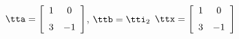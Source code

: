{$\tta = \left[ \begin {array}{cc} 1&0 \\ \noalign{\medskip} 3&-1  \end {array} \right] $, 
 \quad
$\ttb=\tti_2 $}
{$\ttx=\left[ \begin {array}{cc} 1&0 \\ \noalign{\medskip} 3&-1  \end {array} \right] $}
